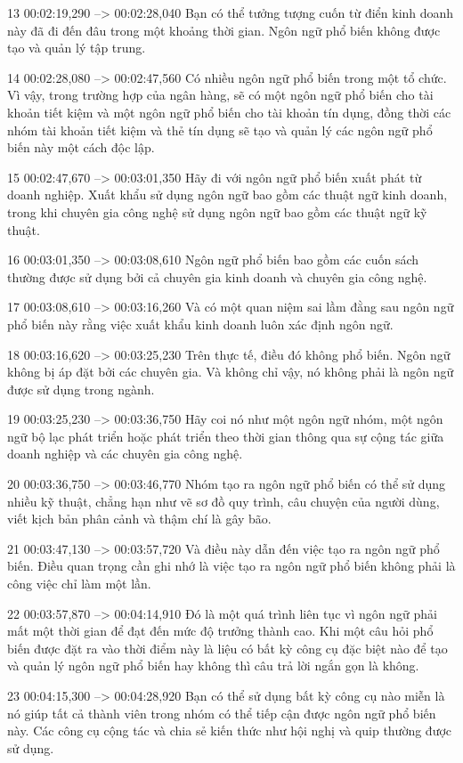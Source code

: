 13
00:02:19,290 --> 00:02:28,040
Bạn có thể tưởng tượng cuốn từ điển kinh doanh này đã đi đến đâu trong một khoảng thời gian.  Ngôn ngữ phổ biến không được tạo và quản lý tập trung.

14
00:02:28,080 --> 00:02:47,560
Có nhiều ngôn ngữ phổ biến trong một tổ chức.  Vì vậy, trong trường hợp của ngân hàng, sẽ có một ngôn ngữ phổ biến cho tài khoản tiết kiệm và một ngôn ngữ phổ biến cho tài khoản tín dụng, đồng thời các nhóm tài khoản tiết kiệm và thẻ tín dụng sẽ tạo và quản lý các ngôn ngữ phổ biến này một cách độc lập.

15
00:02:47,670 --> 00:03:01,350
Hãy đi với ngôn ngữ phổ biến xuất phát từ doanh nghiệp.  Xuất khẩu sử dụng ngôn ngữ bao gồm các thuật ngữ kinh doanh, trong khi chuyên gia công nghệ sử dụng ngôn ngữ bao gồm các thuật ngữ kỹ thuật.

16
00:03:01,350 --> 00:03:08,610
Ngôn ngữ phổ biến bao gồm các cuốn sách thường được sử dụng bởi cả chuyên gia kinh doanh và chuyên gia công nghệ.

17
00:03:08,610 --> 00:03:16,260
Và có một quan niệm sai lầm đằng sau ngôn ngữ phổ biến này rằng việc xuất khẩu kinh doanh luôn xác định ngôn ngữ.

18
00:03:16,620 --> 00:03:25,230
Trên thực tế, điều đó không phổ biến.  Ngôn ngữ không bị áp đặt bởi các chuyên gia.  Và không chỉ vậy, nó không phải là ngôn ngữ được sử dụng trong ngành.

19
00:03:25,230 --> 00:03:36,750
Hãy coi nó như một ngôn ngữ nhóm, một ngôn ngữ bộ lạc phát triển hoặc phát triển theo thời gian thông qua sự cộng tác giữa doanh nghiệp và các chuyên gia công nghệ.

20
00:03:36,750 --> 00:03:46,770
Nhóm tạo ra ngôn ngữ phổ biến có thể sử dụng nhiều kỹ thuật, chẳng hạn như vẽ sơ đồ quy trình, câu chuyện của người dùng, viết kịch bản phân cảnh và thậm chí là gây bão.

21
00:03:47,130 --> 00:03:57,720
Và điều này dẫn đến việc tạo ra ngôn ngữ phổ biến.  Điều quan trọng cần ghi nhớ là việc tạo ra ngôn ngữ phổ biến không phải là công việc chỉ làm một lần.

22
00:03:57,870 --> 00:04:14,910
Đó là một quá trình liên tục vì ngôn ngữ phải mất một thời gian để đạt đến mức độ trưởng thành cao.  Khi một câu hỏi phổ biến được đặt ra vào thời điểm này là liệu có bất kỳ công cụ đặc biệt nào để tạo và quản lý ngôn ngữ phổ biến hay không thì câu trả lời ngắn gọn là không.

23
00:04:15,300 --> 00:04:28,920
Bạn có thể sử dụng bất kỳ công cụ nào miễn là nó giúp tất cả thành viên trong nhóm có thể tiếp cận được ngôn ngữ phổ biến này.  Các công cụ cộng tác và chia sẻ kiến ​​thức như hội nghị và quip thường được sử dụng.

